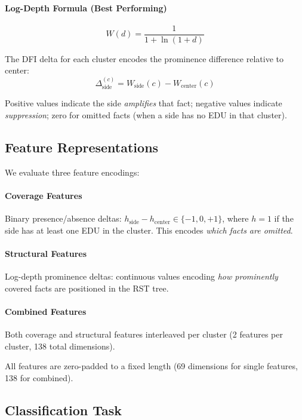 \documentclass[11pt]{article}
\begin{document}
\paragraph{Log-Depth Formula (Best Performing)}
\begin{equation}
W(d) = \frac{1}{1 + \ln(1+d)}
\end{equation}

The DFI delta for each cluster encodes the prominence difference relative to center:
\begin{equation}
\Delta^{(c)}_{\text{side}} = W_{\text{side}}(c) - W_{\text{center}}(c)
\end{equation}

Positive values indicate the side \emph{amplifies} that fact; negative values indicate \emph{suppression}; zero for omitted facts (when a side has no EDU in that cluster).

\subsection{Feature Representations}

We evaluate three feature encodings:

\paragraph{Coverage Features}
Binary presence/absence deltas: $h_{\text{side}} - h_{\text{center}} \in \{-1, 0, +1\}$, where $h=1$ if the side has at least one EDU in the cluster. This encodes \emph{which facts are omitted}.

\paragraph{Structural Features}
Log-depth prominence deltas: continuous values encoding \emph{how prominently} covered facts are positioned in the RST tree.

\paragraph{Combined Features}
Both coverage and structural features interleaved per cluster (2 features per cluster, 138 total dimensions).

All features are zero-padded to a fixed length (69 dimensions for single features, 138 for combined).

\subsection{Classification Task}
\end{document}
